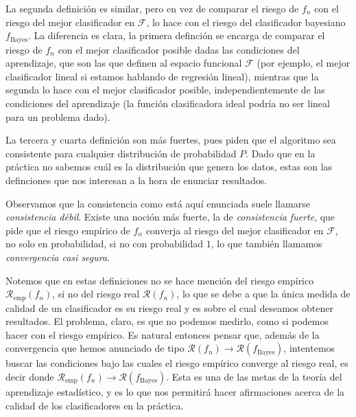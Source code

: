 \documentclass{report}
\begin{document}
La segunda definición es similar, pero en vez de comparar el riesgo de $f_n$ con el riesgo del mejor clasificador en $\mathcal{F}$,
lo hace con el riesgo del clasificador bayesiano $f_{\text{Bayes}}$. La diferencia es clara, la primera definción se encarga de 
comparar el riesgo de $f_n$ con el mejor clasificador posible dadas las condiciones del aprendizaje, que son las que definen al espacio funcional 
$\mathcal{F}$ (por ejemplo, el mejor clasificador lineal si estamos hablando de regresión lineal), mientras que la segunda lo hace con el
mejor clasificador posible, independientemente de las condiciones del aprendizaje (la función clasificadora ideal podría no ser lineal
para un problema dado).\newline

La tercera y cuarta definición son más fuertes, pues piden que el algoritmo sea consistente para cualquier distribución de probabilidad $P$.
Dado que en la práctica no sabemos cuál es la distribución que genera los datos, estas son las definciones que nos interesan a la hora de 
enunciar resultados.\newline

Observamos que la consistencia como está aquí enunciada suele llamarse \textit{consistencia débil}. Existe una noción más fuerte, la de
\textit{consistencia fuerte}, que pide que el riesgo empírico de $f_n$ converja al riesgo del mejor clasificador en $\mathcal{F}$, no solo
en probabilidad, si no con probabilidad $1$, lo que también llamamos \textit{convergencia casi segura}.\newline

Notemos que en estas definiciones no se hace mención del riesgo empírico $\mathcal{R}_{\text{emp}}(f_n)$, si no del riesgo real $\mathcal{R}(f_n)$, lo que
se debe a que la única medida de calidad de un clasificador es su riesgo real y es sobre el cual deseamos obtener resultados. El problema, claro,
es que no podemos medirlo, como si podemos hacer con el riesgo empírico. Es natural entonces pensar que, además de la convergencia que hemos anunciado
de tipo $\mathcal{R}(f_n) \rightarrow \mathcal{R}(f_{\text{Bayes}})$, intentemos buscar las condiciones bajo las cuales el riesgo empírico
converge al riesgo real, es decir donde  $\mathcal{R}_{\text{emp}}(f_n) \rightarrow \mathcal{R}(f_{\text{Bayes}})$. Esta es una de las metas
de la teoría del aprendizaje estadístico, y es lo que nos permitirá hacer afirmaciones acerca de la calidad de los clasificadores en la práctica.\newline
\end{document}
